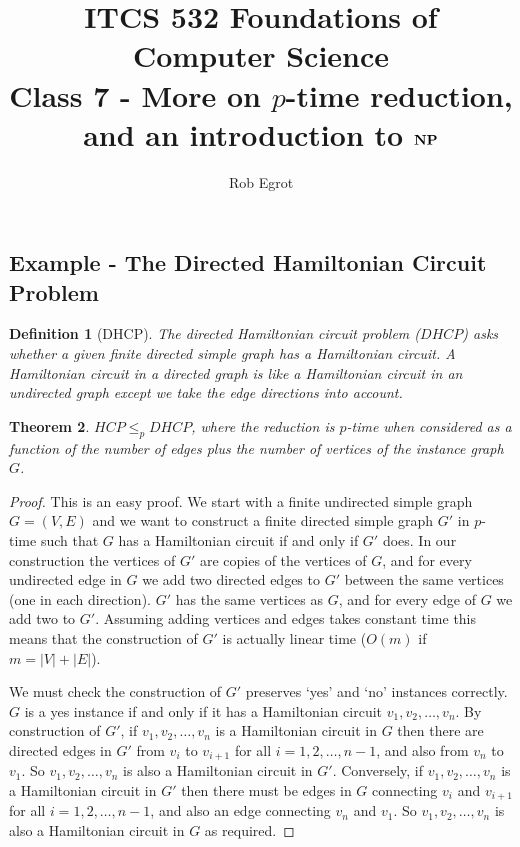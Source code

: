\documentclass{article}
\title{ITCS 532 Foundations of Computer Science\\
Class 7 - More on $p$-time reduction, and an introduction to $\mathbf{NP}$}
\author{Rob Egrot}
\date{}
\theoremstyle{plain}
\newtheorem{theorem}{Theorem}[section]{\bfseries}{\itshape}
\newtheorem{definition}[theorem]{Definition}{\bfseries}{\upshape}
\theoremstyle{definition}
\begin{document}
\maketitle
\subsection{Example - The Directed Hamiltonian Circuit Problem}
\begin{definition}[DHCP]
The directed Hamiltonian circuit problem ($DHCP$) asks whether a given finite \emph{directed} simple graph has a Hamiltonian circuit. A Hamiltonian circuit in a directed graph is like a Hamiltonian circuit in an undirected graph except we take the edge directions into account. 
\end{definition}

\begin{theorem}
$HCP\leq_p DHCP$, where the reduction is $p$-time when considered as a function of the number of edges plus the number of vertices of the instance graph $G$.
\end{theorem}
\begin{proof}
This is an easy proof. We start with a finite undirected simple graph $G=(V,E)$ and we want to construct a finite directed simple graph $G'$ in $p$-time such that $G$ has a Hamiltonian circuit if and only if $G'$ does. In our construction the vertices of $G'$ are copies of the vertices of $G$, and for every undirected edge in $G$ we add two directed edges to $G'$ between the same vertices (one in each direction). $G'$ has the same vertices as $G$, and for every edge of $G$ we add two to $G'$. Assuming adding vertices and edges takes constant time this means that the construction of $G'$ is actually linear time ($O(m)$ if $m=|V|+|E|$). 

We must check the construction of $G'$ preserves `yes' and `no' instances correctly. $G$ is a yes instance if and only if it has a Hamiltonian circuit $v_1,v_2,\ldots,v_n$. By construction of $G'$, if $v_1,v_2,\ldots,v_n$ is a Hamiltonian circuit in $G$ then there are directed edges in $G'$ from $v_i$ to $v_{i+1}$ for all $i=1,2,\ldots,n-1$, and also from $v_n$ to $v_1$. So $v_1,v_2,\ldots,v_n$ is also a Hamiltonian circuit in $G'$. Conversely, if $v_1,v_2,\ldots,v_n$ is a Hamiltonian circuit in $G'$ then there must be edges in $G$ connecting $v_i$ and $v_{i+1}$ for all $i=1,2,\ldots,n-1$, and also an edge connecting $v_n$ and $v_1$. So $v_1,v_2,\ldots,v_n$ is also a Hamiltonian circuit in $G$ as required.     
\end{proof}
\end{document}
